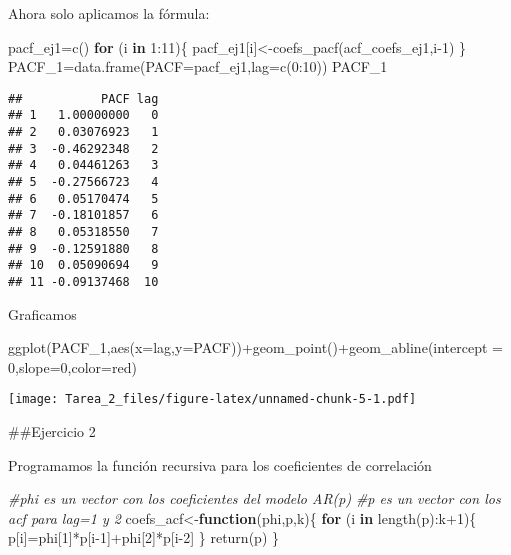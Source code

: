 \documentclass[
]{article}
\newenvironment{Shaded}{\begin{snugshade}}{\end{snugshade}}
\newcommand{\AttributeTok}[1]{\textcolor[rgb]{0.77,0.63,0.00}{#1}}
\newcommand{\CommentTok}[1]{\textcolor[rgb]{0.56,0.35,0.01}{\textit{#1}}}
\newcommand{\ControlFlowTok}[1]{\textcolor[rgb]{0.13,0.29,0.53}{\textbf{#1}}}
\newcommand{\DecValTok}[1]{\textcolor[rgb]{0.00,0.00,0.81}{#1}}
\newcommand{\FunctionTok}[1]{\textcolor[rgb]{0.00,0.00,0.00}{#1}}
\newcommand{\NormalTok}[1]{#1}
\newcommand{\OtherTok}[1]{\textcolor[rgb]{0.56,0.35,0.01}{#1}}
\newcommand{\SpecialCharTok}[1]{\textcolor[rgb]{0.00,0.00,0.00}{#1}}
\newcommand{\StringTok}[1]{\textcolor[rgb]{0.31,0.60,0.02}{#1}}
\begin{document}
Ahora solo aplicamos la fórmula:

\begin{Shaded}
\begin{Highlighting}[]
\NormalTok{pacf\_ej1}\OtherTok{=}\FunctionTok{c}\NormalTok{()}
\ControlFlowTok{for}\NormalTok{ (i }\ControlFlowTok{in} \DecValTok{1}\SpecialCharTok{:}\DecValTok{11}\NormalTok{)\{}
\NormalTok{  pacf\_ej1[i]}\OtherTok{\textless{}{-}}\FunctionTok{coefs\_pacf}\NormalTok{(acf\_coefs\_ej1,i}\DecValTok{{-}1}\NormalTok{)}
\NormalTok{\}}
\NormalTok{PACF\_1}\OtherTok{=}\FunctionTok{data.frame}\NormalTok{(}\AttributeTok{PACF=}\NormalTok{pacf\_ej1,}\AttributeTok{lag=}\FunctionTok{c}\NormalTok{(}\DecValTok{0}\SpecialCharTok{:}\DecValTok{10}\NormalTok{))}
\NormalTok{PACF\_1}
\end{Highlighting}
\end{Shaded}

\begin{verbatim}
##           PACF lag
## 1   1.00000000   0
## 2   0.03076923   1
## 3  -0.46292348   2
## 4   0.04461263   3
## 5  -0.27566723   4
## 6   0.05170474   5
## 7  -0.18101857   6
## 8   0.05318550   7
## 9  -0.12591880   8
## 10  0.05090694   9
## 11 -0.09137468  10
\end{verbatim}

Graficamos

\begin{Shaded}
\begin{Highlighting}[]
\FunctionTok{ggplot}\NormalTok{(PACF\_1,}\FunctionTok{aes}\NormalTok{(}\AttributeTok{x=}\NormalTok{lag,}\AttributeTok{y=}\NormalTok{PACF))}\SpecialCharTok{+}\FunctionTok{geom\_point}\NormalTok{()}\SpecialCharTok{+}\FunctionTok{geom\_abline}\NormalTok{(}\AttributeTok{intercept =} \DecValTok{0}\NormalTok{,}\AttributeTok{slope=}\DecValTok{0}\NormalTok{,}\AttributeTok{color=}\StringTok{\textquotesingle{}red\textquotesingle{}}\NormalTok{)}
\end{Highlighting}
\end{Shaded}

\texttt{[image: Tarea\_2\_files/figure-latex/unnamed-chunk-5-1.pdf]}

\#\#Ejercicio 2

Programamos la función recursiva para los coeficientes de correlación

\begin{Shaded}
\begin{Highlighting}[]
\CommentTok{\#phi es un vector con los coeficientes del modelo AR(p)}
\CommentTok{\#p es un vector con los acf para lag=1 y 2}
\NormalTok{coefs\_acf}\OtherTok{\textless{}{-}}\ControlFlowTok{function}\NormalTok{(phi,p,k)\{}
  \ControlFlowTok{for}\NormalTok{ (i }\ControlFlowTok{in} \FunctionTok{length}\NormalTok{(p)}\SpecialCharTok{:}\NormalTok{k}\SpecialCharTok{+}\DecValTok{1}\NormalTok{)\{}
\NormalTok{    p[i]}\OtherTok{=}\NormalTok{phi[}\DecValTok{1}\NormalTok{]}\SpecialCharTok{*}\NormalTok{p[i}\DecValTok{{-}1}\NormalTok{]}\SpecialCharTok{+}\NormalTok{phi[}\DecValTok{2}\NormalTok{]}\SpecialCharTok{*}\NormalTok{p[i}\DecValTok{{-}2}\NormalTok{]}
\NormalTok{  \}}
  \FunctionTok{return}\NormalTok{(p)}
\NormalTok{\}}
\end{Highlighting}
\end{Shaded}
\end{document}
